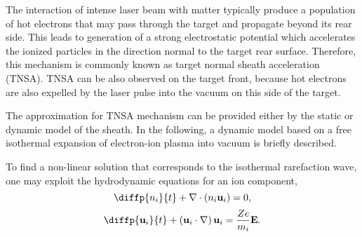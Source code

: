 The interaction of intense laser beam with matter typically produce a population of hot electrons that may pass through the target and propagate beyond its rear side. This leads to generation of a strong electrostatic potential which accelerates the ionized particles in the direction normal to the target rear surface. Therefore, this mechanism is commonly known as target normal sheath acceleration (TNSA). TNSA can be also observed on the target front, because hot electrons are also expelled by the laser pulse into the vacuum on this side of the target.

The approximation for TNSA mechanism can be provided either by the static or dynamic model of the sheath. In the following, a dynamic model based on a free isothermal expansion of electron-ion plasma into vacuum is briefly described.

To find a non-linear solution that corresponds to the isothermal rarefaction wave, one may exploit the hydrodynamic equations for an ion component,
\begin{equation}
\label{2.7.2.2}
\diffp{n_i}{t} + \div{\left(n_i \vec{u}_i\right)} = 0,
\end{equation}
\begin{equation}
\label{2.7.2.3}
\diffp{\vec{u}_i}{t} + \left(\vec{u}_i \cdot \grad{} \right) \vec{u}_i = \frac{Z e}{m_i} \vec{E}. 
\end{equation}

